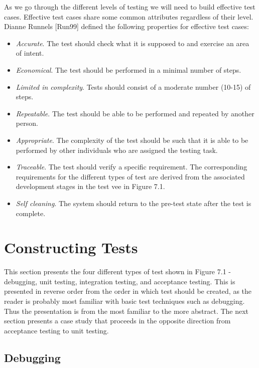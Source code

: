 As we go through the different levels of testing we will need to build
effective test cases. Effective test cases share some common attributes
regardless of their level. Dianne Runnels {[}Run99{]} defined the
following properties for effective test cases:

\begin{itemize}
\item
  \emph{Accurate}. The test should check what it is supposed to and
  exercise an area of intent.
\item
  \emph{Economical}. The test should be performed in a minimal number of
  steps.
\item
  \emph{Limited in complexity}. Tests should consist of a moderate
  number (10-15) of steps.
\item
  \emph{Repeatable}. The test should be able to be performed and
  repeated by another person.
\item
  \emph{Appropriate}. The complexity of the test should be such that it
  is able to be performed by other individuals who are assigned the
  testing task.
\item
  \emph{Traceable}. The test should verify a specific requirement. The
  corresponding requirements for the different types of test are derived
  from the associated development stages in the test vee in Figure 7.1.
\item
  \emph{Self cleaning}. The system should return to the pre-test state
  after the test is complete.
\end{itemize}

\section{Constructing Tests}
\label{section:constructing-tests}

This section presents the four different types of test shown in Figure
7.1 - debugging, unit testing, integration testing, and acceptance
testing. This is presented in reverse order from the order in which test
should be created, as the reader is probably most familiar with basic
test techniques such as debugging. Thus the presentation is from the
most familiar to the more abstract. The next section presents a case
study that proceeds in the opposite direction from acceptance testing to
unit testing.

\subsection{Debugging}
\label{subsection:debugging}

